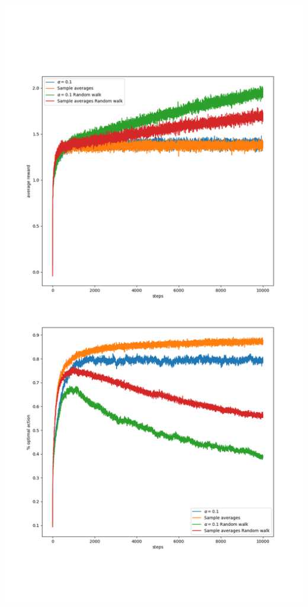\documentclass{article}
\begin{document}
    \includegraphics[scale=0.5]{figure_e_2_5}
\end{document}
